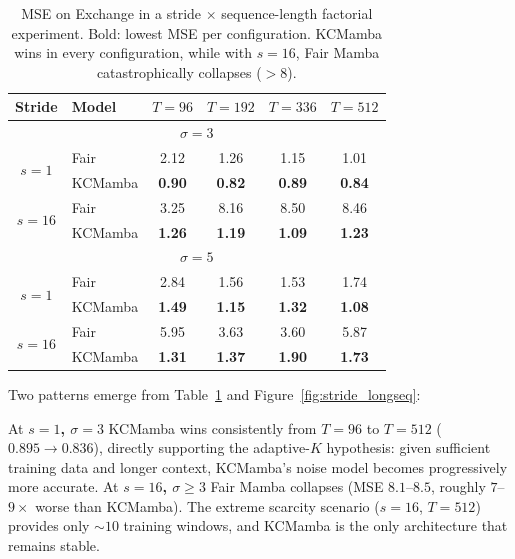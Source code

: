 \begin{table}[H]
    \centering
    \small
    \begin{tabular}{|c|l|cccc|}
        \hline
        \textbf{Stride} & \textbf{Model} &
        $T{=}96$ & $T{=}192$ & $T{=}336$ & $T{=}512$ \\
        \hline\hline
        \multicolumn{6}{|c|}{$\sigma{=}3$} \\
        \hline
        \multirow{2}{*}{$s=1$}
            & Fair  & 2.12 & 1.26 & 1.15 & 1.01 \\
            & KCMamba   & \textbf{0.90} & \textbf{0.82} & \textbf{0.89} & \textbf{0.84} \\
        \hline
        \multirow{2}{*}{$s=16$}
            & Fair  & 3.25 & 8.16 & 8.50 & 8.46 \\
            & KCMamba   & \textbf{1.26} & \textbf{1.19} & \textbf{1.09} & \textbf{1.23} \\
        \hline\hline
        \multicolumn{6}{|c|}{$\sigma{=}5$} \\
        \hline
        \multirow{2}{*}{$s=1$}
            & Fair  & 2.84 & 1.56 & 1.53 & 1.74 \\
            & KCMamba   & \textbf{1.49} & \textbf{1.15} & \textbf{1.32} & \textbf{1.08} \\
        \hline
        \multirow{2}{*}{$s=16$}
            & Fair  & 5.95 & 3.63 & 3.60 & 5.87 \\
            & KCMamba   & \textbf{1.31} & \textbf{1.37} & \textbf{1.90} & \textbf{1.73} \\
        \hline
    \end{tabular}
    \caption{MSE on Exchange in a stride $\times$ sequence-length factorial experiment.
             Bold: lowest MSE per configuration.
             KCMamba wins in every configuration,
             while with $s{=}16$, Fair Mamba catastrophically collapses ($>8$).}
    \label{tab:stride_longseq}
\end{table}

Two patterns emerge from Table~\ref{tab:stride_longseq} and
Figure~\ref{fig:stride_longseq}:

At \textbf{$s{=}1$, $\sigma{=}3$} KCMamba wins consistently from $T{=}96$
to $T{=}512$ ($0.895 \to 0.836$), directly supporting the adaptive-$K$
hypothesis: given sufficient training data and longer context,
KCMamba's noise model becomes progressively more accurate.
At \textbf{$s{=}16$, $\sigma{\geq}3$} Fair Mamba collapses
(MSE $8.1$--$8.5$, roughly $7$--$9\times$ worse than KCMamba). The extreme scarcity scenario
($s{=}16$, $T{=}512$) provides only $\sim{}10$ training windows, and
KCMamba is the only architecture that remains stable.

